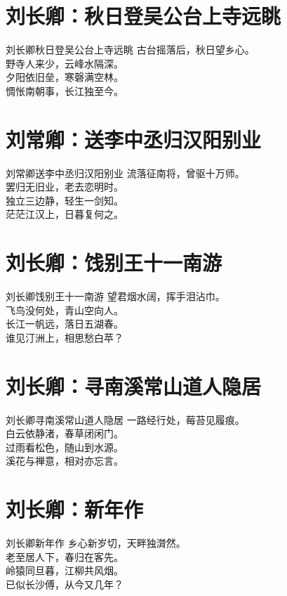 \documentclass[12pt,oneside,a5paper]{book}
\begin{document}
\chapter{刘长卿：秋日登吴公台上寺远眺}
\begin{poemzh}{刘长卿}{秋日登吴公台上寺远眺}
古台摇落后，秋日望乡心。\\
野寺人来少，云峰水隔深。\\
夕阳依旧垒，寒磬满空林。\\
惆怅南朝事，长江独至今。\\ 
\end{poemzh}

\chapter{刘常卿：送李中丞归汉阳别业}
\begin{poemzh}{刘常卿}{送李中丞归汉阳别业}
流落征南将，曾驱十万师。\\
罢归无旧业，老去恋明时。\\
独立三边静，轻生一剑知。\\
茫茫江汉上，日暮复何之。\\ 
\end{poemzh}

\chapter{刘长卿：饯别王十一南游}
\begin{poemzh}{刘长卿}{饯别王十一南游}
望君烟水阔，挥手泪沾巾。\\
飞鸟没何处，青山空向人。\\
长江一帆远，落日五湖春。\\
谁见汀洲上，相思愁白苹？\\ 
\end{poemzh}

\chapter{刘长卿：寻南溪常山道人隐居}
\begin{poemzh}{刘长卿}{寻南溪常山道人隐居}
一路经行处，莓苔见履痕。\\
白云依静渚，春草闭闲门。\\
过雨看松色，随山到水源。\\
溪花与禅意，相对亦忘言。\\ 
\end{poemzh}

\chapter{刘长卿：新年作}
\begin{poemzh}{刘长卿}{新年作}
乡心新岁切，天畔独潸然。\\
老至居人下，春归在客先。\\
岭猿同旦暮，江柳共风烟。\\
已似长沙傅，从今又几年？\\ 
\end{poemzh}
\end{document}
